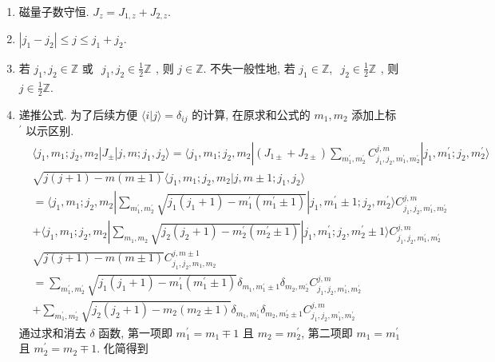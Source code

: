 \documentclass[../../main.tex]{subfiles}
\begin{document}
\begin{enumerate}
    \item 磁量子数守恒. $J_{z} = J_{1,z} + J_{2,z}$.
    \item $|j_{1}-j_{2}|\leq j\leq j_{1} + j_{2}$.
    \item 若 $j_{1},j_{2}\in \mathbb{Z}$ 或 $\begin{aligned}
        j_{1},j_{2}\in\frac{1}{2}\mathbb{Z}
    \end{aligned}$, 则 $j\in\mathbb{Z}$. 不失一般性地, 若 $j_{1}\in\mathbb{Z}$, $\begin{aligned}
        j_{2}\in\frac{1}{2}\mathbb{Z}
    \end{aligned}$, 则 $j\in\frac{1}{2}\mathbb{Z}$.
    \item 递推公式. 为了后续方便 $\langle i|j\rangle = \delta_{ij}$ 的计算, 在原求和公式的 $m_{1},m_{2}$ 添加上标 $^{\prime}$ 以示区别.
    \begin{align*}
&\langle j_{1},m_{1};j_{2},m_{2}|J_{\pm}|j,m;j_{1},j_{2}\rangle = \langle j_{1},m_{1};j_{2},m_{2}|(J_{1\pm} + J_{2\pm})\sum_{m_{1}^{\prime},m_{2}^{\prime}}C_{j_{1},j_{2},m_{1}^{\prime},m_{2}^{\prime}}^{j,m}|j_{1},m_{1}^{\prime};j_{2},m_{2}^{\prime}\rangle\\
&\sqrt{j(j+1)-m(m\pm 1)}\langle j_{1},m_{1};j_{2},m_{2}|j,m\pm 1;j_{1},j_{2}\rangle\\
&= \langle j_{1},m_{1};j_{2},m_{2}|\sum_{m_{1}^{\prime},m_{2}^{\prime}}\sqrt{j_{1}(j_{1}+1)-m_{1}^{\prime}(m_{1}^{\prime}\pm 1)}|j_{1},m_{1}^{\prime}\pm 1;j_{2},m_{2}^{\prime}\rangle C_{j_{1},j_{2},m_{1}^{\prime},m_{2}^{\prime}}^{j,m}\\
&+\langle j_{1},m_{1};j_{2},m_{2}|\sum_{m_{1},m_{2}}\sqrt{j_{2}(j_{2}+1) - m_{2}^{\prime}(m_{2}^{\prime}\pm 1)}|j_{1},m_{1}^{\prime};j_{2},m_{2}^{\prime}\pm 1\rangle C_{j_{1},j_{2},m_{1}^{\prime},m_{2}^{\prime}}^{j,m}\\
&\sqrt{j(j+1)-m(m\pm 1)}C_{j_{1},j_{2},m_{1},m_{2}}^{j,m\pm 1}\\
&= \sum_{m_{1}^{\prime},m_{2}^{\prime}}\sqrt{j_{1}(j_{1}+1)-m_{1}^{\prime}(m_{1}^{\prime}\pm 1)}\delta_{m_{1},m_{1}^{\prime}\pm 1}\delta_{m_{2},m_{2}^{\prime}}C_{j_{1},j_{2},m_{1}^{\prime},m_{2}^{\prime}}^{j,m}\\
&+ \sum_{m_{1}^{\prime},m_{2}^{\prime}}\sqrt{j_{2}(j_{2}+1)-m_{2}(m_{2}\pm 1)}\delta_{m_{1},m_{1}^{\prime}}\delta_{m_{2},m_{2}^{\prime}\pm 1}C_{j_{1},j_{2},m_{1}^{\prime},m_{2}^{\prime}}^{j,m}
    \end{align*}
通过求和消去 $\delta$ 函数, 第一项即 $m_{1}^{\prime} = m_{1}\mp 1$ 且 $m_{2}=m_{2}^{\prime}$, 第二项即 $m_{1} = m_{1}^{\prime}$ 且 $m_{2}^{\prime} = m_{2}\mp 1$. 化简得到


\end{enumerate}
\end{document}
